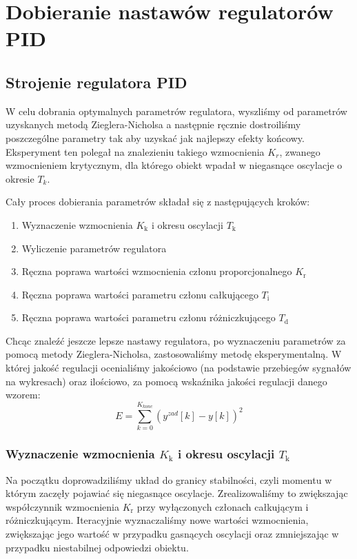 \chapter{Dobieranie nastawów regulatorów PID}
\label{zad5}

\section{Strojenie regulatora PID}
\label{zad5_PID_wykresy}
W celu dobrania optymalnych parametrów regulatora, wyszliśmy od parametrów uzyskanych metodą
Zieglera-Nicholsa a następnie ręcznie dostroiliśmy poszczególne parametry tak aby uzyskać
jak najlepszy efekty końcowy. Eksperyment ten polegał na znalezieniu takiego wzmocnienia $K_{r}$, 
zwanego wzmocnieniem krytycznym, dla którego obiekt wpadał w niegasnące oscylacje o okresie $T_{k}$. 

Cały proces dobierania parametrów składał się z następujących kroków:
\begin{center}
\begin{enumerate}
    \item Wyznaczenie wzmocnienia $K_{\mathrm{k}}$ i okresu oscylacji $T_{\mathrm{k}}$
    \item Wyliczenie parametrów regulatora
    \item Ręczna poprawa wartości wzmocnienia członu proporcjonalnego $K_{\mathrm{r}}$
    \item Ręczna poprawa wartości parametru członu całkującego $T_{\mathrm{i}}$
    \item Ręczna poprawa wartości parametru członu różniczkującego $T_{\mathrm{d}}$
\end{enumerate}
\end{center}

Chcąc znaleźć jeszcze lepsze nastawy regulatora, po wyznaczeniu parametrów za pomocą metody Zieglera-Nicholsa, zastosowaliśmy metodę eksperymentalną. W której jakość regulacji ocenialiśmy jakościowo (na podstawie przebiegów sygnałów na wykresach) oraz ilościowo, za pomocą wskaźnika jakości regulacji danego wzorem:
\begin{equation}
E=\sum_{k=0}^{K_{konc}}(y^{zad}[k]-y[k])^{2}
\end{equation}


\subsection{Wyznaczenie wzmocnienia $K_{\mathrm{k}}$ i okresu oscylacji $T_{\mathrm{k}}$}
\label{zad5_wyznaczanie_parametrow_zn}
Na początku doprowadziliśmy układ do granicy stabilności, czyli momentu
w którym zaczęły pojawiać się niegasnące oscylacje. Zrealizowaliśmy to
zwiększając współczynnik wzmocnienia $K_{\mathrm{r}}$ przy wyłączonych członach 
całkującym i różniczkującym. Iteracyjnie wyznaczaliśmy nowe wartości wzmocnienia,
zwiększając jego wartość w przypadku gasnących oscylacji oraz zmniejszając w przypadku
niestabilnej odpowiedzi obiektu.

